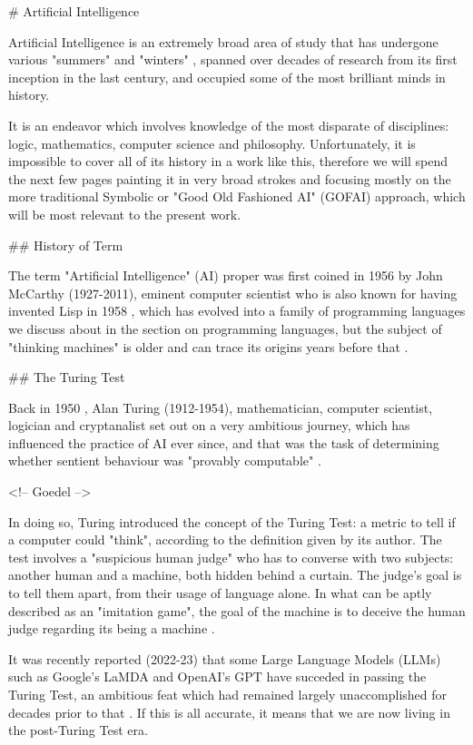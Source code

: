 # Artificial Intelligence

Artificial Intelligence is an extremely broad area of study that has undergone various "summers" and "winters" \cite{ilkou2020symbolic}, spanned over decades of research from its first inception in the last century, and occupied some of the most brilliant minds in history.

It is an endeavor which involves knowledge of the most disparate of disciplines: logic, mathematics, computer science and philosophy. Unfortunately, it is impossible to cover all of its history in a work like this, therefore we will spend the next few pages painting it in very broad strokes and focusing mostly on the more traditional Symbolic or "Good Old Fashioned AI" (GOFAI) approach, which will be most relevant to the present work.

## History of Term

The term "Artificial Intelligence" (AI) proper was first coined in 1956 by John McCarthy (1927-2011), eminent computer scientist who is also known for having invented Lisp in 1958 \cite{lisproots}, which has evolved into a family of programming languages we discuss about in the section on programming languages, but the subject of "thinking machines" is older and can trace its origins years before that \cite{smith2006history}.

## The Turing Test

Back in 1950 \cite{turing2009computing}, Alan Turing (1912-1954), mathematician, computer scientist, logician and cryptanalist set out on a very ambitious journey, which has influenced the practice of AI ever since, and that was the task of determining whether sentient behaviour was "provably computable" \cite{smith2006history}.

<!-- Goedel -->

In doing so, Turing introduced the concept of the Turing Test: a metric to tell if a computer could "think", according to the definition given by its author. The test involves a "suspicious human judge" who has to converse with two subjects: another human and a machine, both hidden behind a curtain. The judge's goal is to tell them apart, from their usage of language alone. In what can be aptly described as an "imitation game", the goal of the machine is to deceive the human judge regarding its being a machine \cite{smith2006history}.

It was recently reported (2022-23) that some Large Language Models (LLMs) such as Google's LaMDA \cite{turingtestobsolete} and OpenAI's GPT \cite{gptbroketuring} have succeded in passing the Turing Test, an ambitious feat which had remained largely unaccomplished for decades prior to that \cite{smith2006history}. If this is all accurate, it means that we are now living in the post-Turing Test era.

